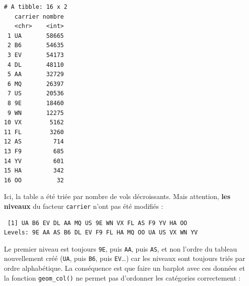 \documentclass[a4paperpaper,]{article}
\newenvironment{Shaded}{\begin{snugshade}}{\end{snugshade}}
\newcommand{\KeywordTok}[1]{\textcolor[rgb]{0.13,0.29,0.53}{\textbf{#1}}}
\newcommand{\DataTypeTok}[1]{\textcolor[rgb]{0.13,0.29,0.53}{#1}}
\newcommand{\StringTok}[1]{\textcolor[rgb]{0.31,0.60,0.02}{#1}}
\newcommand{\CommentTok}[1]{\textcolor[rgb]{0.56,0.35,0.01}{\textit{#1}}}
\newcommand{\OperatorTok}[1]{\textcolor[rgb]{0.81,0.36,0.00}{\textbf{#1}}}
\newcommand{\NormalTok}[1]{#1}
\theoremstyle{definition}
\theoremstyle{definition}
\theoremstyle{definition}
\theoremstyle{remark}
\begin{document}
\begin{Shaded}
\end{Shaded}

\begin{verbatim}
# A tibble: 16 x 2
   carrier nombre
   <chr>    <int>
 1 UA       58665
 2 B6       54635
 3 EV       54173
 4 DL       48110
 5 AA       32729
 6 MQ       26397
 7 US       20536
 8 9E       18460
 9 WN       12275
10 VX        5162
11 FL        3260
12 AS         714
13 F9         685
14 YV         601
15 HA         342
16 OO          32
\end{verbatim}

Ici, la table a été triée par nombre de vols décroissants. Mais
attention, \textbf{les niveaux} du facteur \texttt{carrier} n'ont pas
été modifiés :

\begin{Shaded}
\end{Shaded}

\begin{verbatim}
 [1] UA B6 EV DL AA MQ US 9E WN VX FL AS F9 YV HA OO
Levels: 9E AA AS B6 DL EV F9 FL HA MQ OO UA US VX WN YV
\end{verbatim}

Le premier niveau est toujours \texttt{9E}, puis \texttt{AA}, puis
\texttt{AS}, et non l'ordre du tableau nouvellement créé (\texttt{UA},
puis \texttt{B6}, puis \texttt{EV}\ldots{}) car les niveaux sont
toujours triés par ordre alphabétique. La conséquence est que faire un
barplot avec ces données et la fonction \texttt{geom\_col()} ne permet
pas d'ordonner les catégories correctement :
\end{document}
